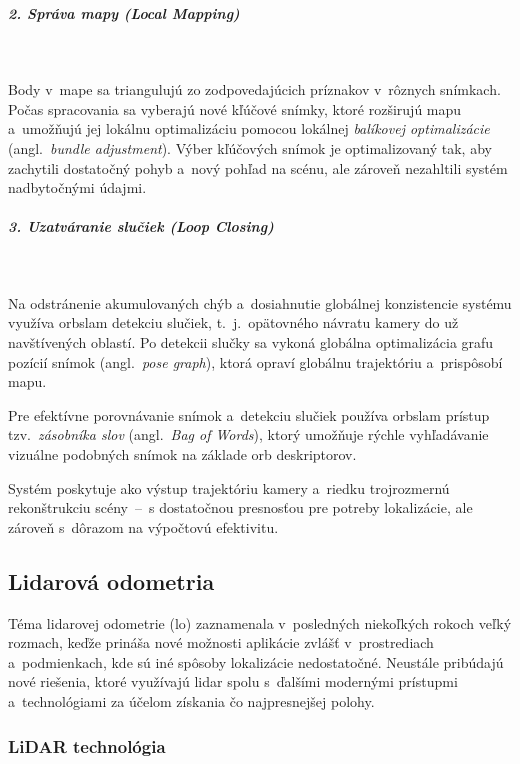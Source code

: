         \subparagraph{2. Správa mapy (Local Mapping)} \
        
          Body v~mape sa triangulujú zo zodpovedajúcich príznakov v~rôznych snímkach. Počas spracovania sa vyberajú nové kľúčové snímky, ktoré rozširujú mapu a~umožňujú jej lokálnu optimalizáciu pomocou lokálnej \emph{balíkovej optimalizácie} (angl.\ \emph{bundle adjustment}). Výber kľúčových snímok je optimalizovaný tak, aby zachytili dostatočný pohyb a~nový pohľad na scénu, ale zároveň nezahltili systém nadbytočnými údajmi.

        \subparagraph{3. Uzatváranie slučiek (Loop Closing)} \
        
          Na odstránenie akumulovaných chýb a~dosiahnutie globálnej konzistencie systému využíva \acrshort{orbslam} detekciu slučiek, t.\ j.\ opätovného návratu kamery do už navštívených oblastí. Po detekcii slučky sa vykoná globálna optimalizácia grafu pozícií snímok (angl.\ \emph{pose graph}), ktorá opraví globálnu trajektóriu a~prispôsobí mapu.

        Pre efektívne porovnávanie snímok a~detekciu slučiek používa \acrshort{orbslam} prístup tzv.\ \emph{zásobníka slov} (angl.\ \emph{Bag of Words}), ktorý umožňuje rýchle vyhľadávanie vizuálne podobných snímok na základe \acrshort{orb} deskriptorov.

        Systém poskytuje ako výstup trajektóriu kamery a~riedku trojrozmernú rekonštrukciu scény~--~s dostatočnou presnosťou pre potreby lokalizácie, ale zároveň s~dôrazom na výpočtovú efektivitu.


  \subsection{Lidarová odometria}
    
    Téma lidarovej odometrie (\acrshort{lo}) zaznamenala v~posledných niekoľkých rokoch veľký rozmach, keďže prináša nové možnosti aplikácie zvlášť v~prostrediach a~podmienkach, kde sú iné spôsoby lokalizácie nedostatočné. Neustále pribúdajú nové riešenia, ktoré využívajú lidar spolu s~ďalšími modernými prístupmi a~technológiami za účelom získania čo najpresnejšej polohy.

    \subsubsection{LiDAR technológia}

